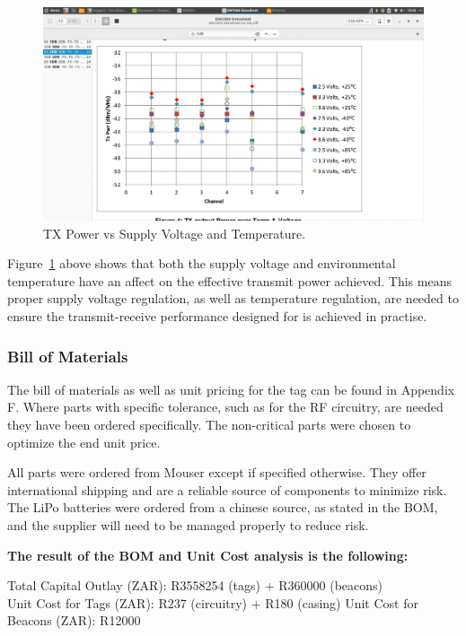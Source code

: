\begin{figure}[H]
\begin{center}
\includegraphics[scale=0.35,trim={7cm 1.5cm 8cm 5.5cm},clip]{data/tx_power.png}
\caption{TX Power vs Supply Voltage and Temperature.\cite{DW-data}}
\label{fig:tx-power}
\end{center}
\end{figure}

Figure~\ref{fig:tx-power} above shows that both the supply voltage and environmental temperature have an affect on the effective transmit power achieved. This means proper supply voltage regulation, as well as temperature regulation, are needed to ensure the transmit-receive performance designed for is achieved in practise.

\subsubsection{Bill of Materials}
The bill of materials as well as unit pricing for the tag can be found in Appendix F. Where parts with specific tolerance, such as for the RF circuitry, are needed they have been ordered specifically. The non-critical parts were chosen to optimize the end unit price. 

All parts were ordered from Mouser except if specified otherwise. They offer international shipping and are a reliable source of components to minimize risk. The LiPo batteries were ordered from a chinese source, as stated in the BOM, and the supplier will need to be managed properly to reduce risk.

\textbf{The result of the BOM and Unit Cost analysis is the following:}

Total Capital Outlay (ZAR): R3558254 (tags) + R360000 (beacons)\\
Unit Cost for Tags (ZAR): R237 (circuitry) + R180 (casing)
Unit Cost for Beacons (ZAR): R12000

